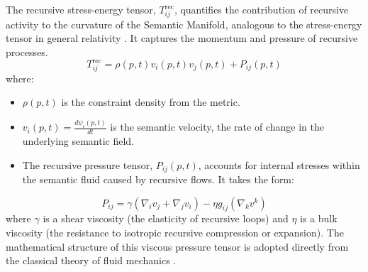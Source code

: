 The recursive stress-energy tensor, \(T_{ij}^{\text{rec}}\), quantifies the contribution of recursive activity to the curvature of the Semantic Manifold, analogous to the stress-energy tensor in general relativity \autocite{Einstein1915}. It captures the momentum and pressure of recursive processes.
\begin{equation}
T_{ij}^{\text{rec}} = \rho(p,t) v_i(p,t) v_j(p,t) + P_{ij}(p,t)
\end{equation}
where:
\begin{itemize}
    \item \(\rho(p,t)\) is the constraint density from the metric.
    \item \(v_i(p,t) = \frac{d\psi_i(p,t)}{dt}\) is the semantic velocity, the rate of change in the underlying semantic field.
    \item The recursive pressure tensor, \(P_{ij}(p,t)\), accounts for internal stresses within the semantic fluid caused by recursive flows. It takes the form:
\end{itemize}
\begin{equation}
P_{ij} = \gamma(\nabla_i v_j + \nabla_j v_i) - \eta g_{ij} (\nabla_k v^k)
\end{equation}
where \(\gamma\) is a shear viscosity (the elasticity of recursive loops) and \(\eta\) is a bulk viscosity (the resistance to isotropic recursive compression or expansion). The mathematical structure of this viscous pressure tensor is adopted directly from the classical theory of fluid mechanics \autocite{LandauLifshitz1987}.